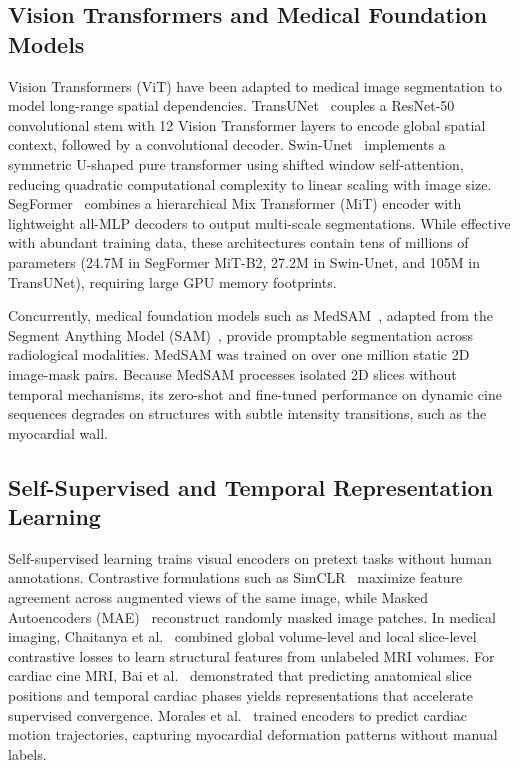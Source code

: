 \documentclass[pdflatex,sn-mathphys]{sn-jnl}
\theoremstyle{thmstyleone}
\theoremstyle{thmstyletwo}
\theoremstyle{thmstylethree}
\begin{document}
\subsection{Vision Transformers and Medical Foundation Models}
Vision Transformers (ViT) have been adapted to medical image segmentation to model long-range spatial dependencies. TransUNet~\cite{chen2021transunet} couples a ResNet-50 convolutional stem with 12 Vision Transformer layers to encode global spatial context, followed by a convolutional decoder. Swin-Unet~\cite{cao2022swin} implements a symmetric U-shaped pure transformer using shifted window self-attention, reducing quadratic computational complexity to linear scaling with image size. SegFormer~\cite{xie2021segformer} combines a hierarchical Mix Transformer (MiT) encoder with lightweight all-MLP decoders to output multi-scale segmentations. While effective with abundant training data, these architectures contain tens of millions of parameters (24.7M in SegFormer MiT-B2, 27.2M in Swin-Unet, and 105M in TransUNet), requiring large GPU memory footprints.

Concurrently, medical foundation models such as MedSAM~\cite{ma2024medsam}, adapted from the Segment Anything Model (SAM)~\cite{kirillov2023segment}, provide promptable segmentation across radiological modalities. MedSAM was trained on over one million static 2D image-mask pairs. Because MedSAM processes isolated 2D slices without temporal mechanisms, its zero-shot and fine-tuned performance on dynamic cine sequences degrades on structures with subtle intensity transitions, such as the myocardial wall.

\subsection{Self-Supervised and Temporal Representation Learning}
Self-supervised learning trains visual encoders on pretext tasks without human annotations. Contrastive formulations such as SimCLR~\cite{chen2020simple} maximize feature agreement across augmented views of the same image, while Masked Autoencoders (MAE)~\cite{he2022masked} reconstruct randomly masked image patches. In medical imaging, Chaitanya et al.~\cite{chaitanya2020contrastive} combined global volume-level and local slice-level contrastive losses to learn structural features from unlabeled MRI volumes. For cardiac cine MRI, Bai et al.~\cite{bai2019self} demonstrated that predicting anatomical slice positions and temporal cardiac phases yields representations that accelerate supervised convergence. Morales et al.~\cite{morales2021self} trained encoders to predict cardiac motion trajectories, capturing myocardial deformation patterns without manual labels.
\end{document}
